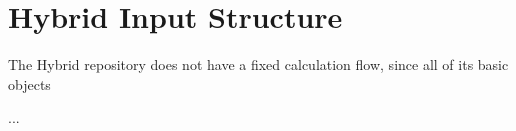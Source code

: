 \section{Hybrid Input Structure}
The Hybrid repository  does not have a fixed calculation flow, since all of its basic
objects 

...